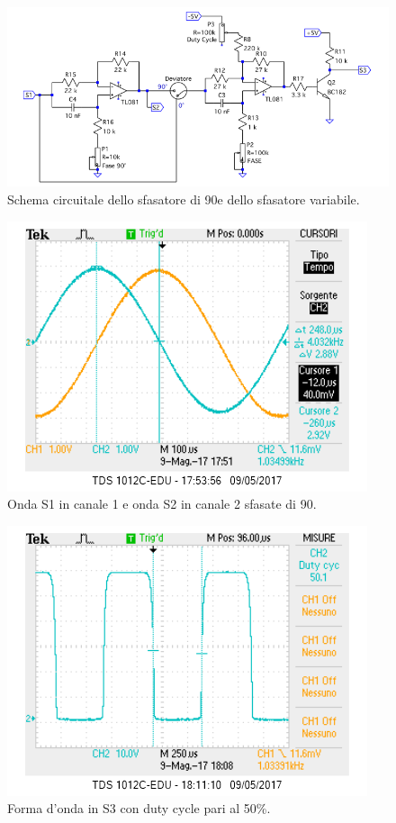 \documentclass[10pt,a4paper]{article}
\begin{document}
\begin{figure}[!htb]
  \centering
  \includegraphics[scale=0.75]{sfasatori.png}
\caption{Schema circuitale dello sfasatore di 90\degree e dello sfasatore variabile.\label{fig:sfasatori}}
\end{figure}

\begin{figure}[!htb]
  \centering
  \includegraphics[scale=0.75]{sfasamento90.png}
\caption{Onda S1 in canale 1 e onda S2 in canale 2 sfasate di 90\degree.\label{osc:sfasamento}}
\end{figure}

\begin{figure}[!htb]
\centering
  \includegraphics[scale=0.75]{dutycycle50.png}
\caption{Forma d'onda in S3 con duty cycle pari al 50\%. 
\label{osc:duty}}
\end{figure}
\end{document}
